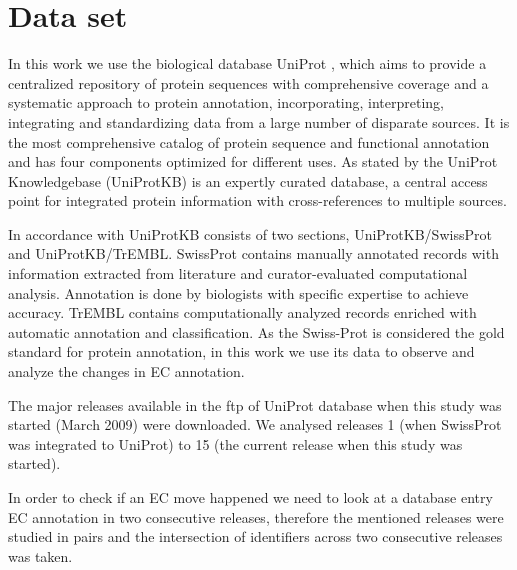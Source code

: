 \section{Data set}
\label{sec:dataset}

In this work we use the biological database UniProt \cite{uniprot2012reorganizing}, which aims to provide a centralized repository of protein sequences with comprehensive coverage and a systematic approach to protein annotation, incorporating, interpreting, integrating and standardizing data from a large number of disparate sources. It is the most comprehensive catalog of protein sequence and functional annotation and has four components optimized for different uses. As stated by \cite{uniprot2012reorganizing} the UniProt Knowledgebase (UniProtKB) is an expertly curated database, a central access point for integrated protein information with cross-references to multiple sources. 
%

In accordance with \cite{apweiler2010universal} UniProtKB consists of two sections, UniProtKB/SwissProt and UniProtKB/TrEMBL. SwissProt contains manually annotated records with information extracted from literature and curator-evaluated computational analysis. Annotation is done by biologists with specific expertise to achieve accuracy. TrEMBL contains computationally analyzed records enriched with automatic annotation and classification. As the Swiss-Prot is considered the gold standard for protein annotation, in this work we use its data to observe and analyze the changes in EC annotation.

The major releases available in the ftp of UniProt database when this study was started (March 2009) were downloaded. We analysed releases 1 (when SwissProt was integrated to UniProt) to 15 (the current release when this study was started). 

In order to check if an EC move happened we need to look at a database entry EC annotation in two consecutive releases, therefore the mentioned releases were studied in pairs and the intersection of identifiers across two consecutive releases was taken.


